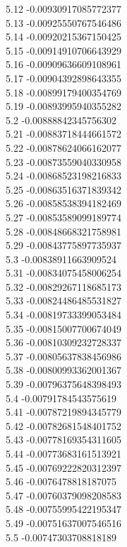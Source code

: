 {5.12	-0.00930917085772377\\
5.13	-0.00925550767546486\\
5.14	-0.00920215367150425\\
5.15	-0.00914910706643929\\
5.16	-0.00909636609108961\\
5.17	-0.00904392898643355\\
5.18	-0.00899179400354769\\
5.19	-0.00893995940355282\\
5.2	-0.00888842345756302\\
5.21	-0.00883718444661572\\
5.22	-0.00878624066162077\\
5.23	-0.00873559040330958\\
5.24	-0.00868523198216833\\
5.25	-0.00863516371839342\\
5.26	-0.00858538394182469\\
5.27	-0.00853589099189774\\
5.28	-0.00848668321758981\\
5.29	-0.00843775897735937\\
5.3	-0.00838911663909524\\
5.31	-0.00834075458006254\\
5.32	-0.00829267118685173\\
5.33	-0.00824486485531827\\
5.34	-0.00819733399053484\\
5.35	-0.00815007700674049\\
5.36	-0.00810309232728337\\
5.37	-0.00805637838456986\\
5.38	-0.00800993362001367\\
5.39	-0.00796375648398493\\
5.4	-0.00791784543575619\\
5.41	-0.00787219894345779\\
5.42	-0.00782681548401752\\
5.43	-0.00778169354311605\\
5.44	-0.00773683161513921\\
5.45	-0.00769222820312397\\
5.46	-0.0076478818187075\\
5.47	-0.00760379098208583\\
5.48	-0.00755995422195347\\
5.49	-0.00751637007546516\\
5.5	-0.00747303708818189\\
}
